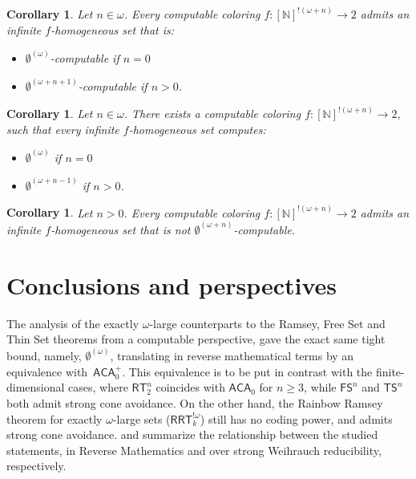 \documentclass{article}
\newcommand{\ACA}[0]{\mathsf{ACA}}
\newcommand{\RRT}[0]{\mathsf{RRT}}
\newcommand{\FS}[0]{\mathsf{FS}}
\newcommand{\TS}[0]{\mathsf{TS}}
\newcommand{\RT}[0]{\mathsf{RT}}
\newcommand{\NN}[0]{\mathbb{N}}
\numberwithin{theorem}{section}
\newtheorem{corollary}[theorem]{Corollary}
\begin{document}
\begin{corollary}
    Let $n \in \omega$. Every computable coloring $f : [\NN]^{!(\omega + n)} \to 2$ admits an infinite $f$-homogeneous set that is:
    \begin{itemize}
        \item $\emptyset^{(\omega)}$-computable if $n = 0$
        \item $\emptyset^{(\omega + n + 1)}$-computable if $n > 0$.
    \end{itemize}
\end{corollary}

\begin{corollary}
    Let $n \in \omega$. There exists a computable coloring $f : [\NN]^{!(\omega + n)} \to 2$, such that every infinite $f$-homogeneous set computes:
    \begin{itemize}
        \item $\emptyset^{(\omega)}$ if $n = 0$
        \item $\emptyset^{(\omega + n - 1)}$ if $n > 0$.
    \end{itemize}
\end{corollary}

\begin{corollary}
    Let $n > 0$. Every computable coloring $f : [\NN]^{!(\omega + n)} \to 2$ admits an infinite $f$-homogeneous set that is not $\emptyset^{(\omega + n)}$-computable. 
\end{corollary}

\fi

\section{Conclusions and perspectives}\label{sec:conclusion}

The analysis of the exactly $\omega$-large counterparts to the Ramsey, Free Set and Thin Set theorems from a computable perspective, gave the exact same tight bound, namely, $\emptyset^{(\omega)}$, translating in reverse mathematical terms by an equivalence with~$\ACA_0^+$. This equivalence is to be put in contrast with the finite-dimensional cases, where $\RT^n_2$ coincides with $\ACA_0$ for $n \geq 3$, while $\FS^n$ and $\TS^n$ both admit strong cone avoidance.
On the other hand, the Rainbow Ramsey theorem for exactly $\omega$-large sets ($\RRT^{!\omega}_k$) still has no coding power, and admits strong cone avoidance.  and   summarize the relationship between the studied statements, in Reverse Mathematics and over strong Weihrauch reducibility, respectively.
\end{document}
